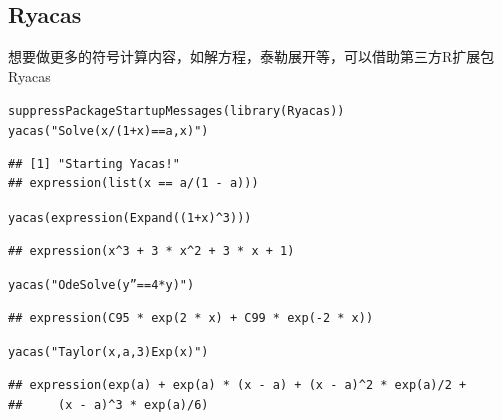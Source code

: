 \documentclass[a4paper]{ctexart}\usepackage[]{graphicx}\usepackage[]{color}
\makeatletter
\newcommand{\hlnum}[1]{\textcolor[rgb]{0.502,0.086,1}{#1}}%
\newcommand{\hlstr}[1]{\textcolor[rgb]{1,0.4,0.2}{#1}}%
\newcommand{\hlopt}[1]{\textcolor[rgb]{0.251,0.251,0.251}{#1}}%
\newcommand{\hlstd}[1]{\textcolor[rgb]{0.251,0.251,0.251}{#1}}%
\newcommand{\hlkwd}[1]{\textcolor[rgb]{0.69,0.188,0.941}{#1}}%
\newenvironment{kframe}{%
 \def\at@end@of@kframe{}%
 \ifinner\ifhmode%
  \def\at@end@of@kframe{\end{minipage}}%
  \begin{minipage}{\columnwidth}%
 \fi\fi%
 \def\FrameCommand##1{\hskip\@totalleftmargin \hskip-\fboxsep
 \colorbox{shadecolor}{##1}\hskip-\fboxsep
     \hskip-\linewidth \hskip-\@totalleftmargin \hskip\columnwidth}%
 \MakeFramed {\advance\hsize-\width
   \@totalleftmargin\z@ \linewidth\hsize
   \@setminipage}}%
 {\par\unskip\endMakeFramed%
 \at@end@of@kframe}
\newenvironment{knitrout}{}{} %
\makeatother
\begin{document}
\subsection{Ryacas}
想要做更多的符号计算内容，如解方程，泰勒展开等，可以借助第三方R扩展包Ryacas \cite{Ryacas}
\begin{knitrout}
\color{fgcolor}\begin{kframe}
\begin{alltt}
\hlkwd{suppressPackageStartupMessages}\hlstd{(}\hlkwd{library}\hlstd{(Ryacas))}
\hlkwd{yacas}\hlstd{(}\hlstr{"Solve(x/(1+x) == a, x)"}\hlstd{)}
\end{alltt}
\begin{verbatim}
## [1] "Starting Yacas!"
## expression(list(x == a/(1 - a)))
\end{verbatim}
\begin{alltt}
\hlkwd{yacas}\hlstd{(}\hlkwd{expression}\hlstd{(}\hlkwd{Expand}\hlstd{((}\hlnum{1} \hlopt{+} \hlstd{x)}\hlopt{^}\hlnum{3}\hlstd{)))}
\end{alltt}
\begin{verbatim}
## expression(x^3 + 3 * x^2 + 3 * x + 1)
\end{verbatim}
\begin{alltt}
\hlkwd{yacas}\hlstd{(}\hlstr{"OdeSolve(y''==4*y)"}\hlstd{)}
\end{alltt}
\begin{verbatim}
## expression(C95 * exp(2 * x) + C99 * exp(-2 * x))
\end{verbatim}
\begin{alltt}
\hlkwd{yacas}\hlstd{(}\hlstr{"Taylor(x,a,3) Exp(x)"}\hlstd{)}
\end{alltt}
\begin{verbatim}
## expression(exp(a) + exp(a) * (x - a) + (x - a)^2 * exp(a)/2 + 
##     (x - a)^3 * exp(a)/6)
\end{verbatim}
\end{kframe}
\end{knitrout}
\end{document}
